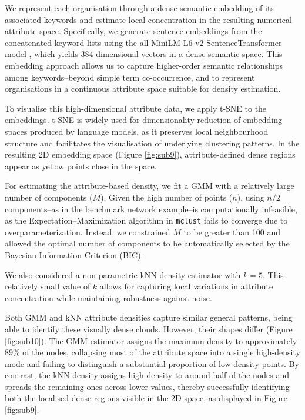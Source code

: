 \documentclass[11pt]{article}
\begin{document}
We represent each organisation through a dense semantic embedding of its associated keywords and estimate local concentration in the resulting numerical attribute space.
Specifically, we generate sentence embeddings from the concatenated keyword lists using the all-MiniLM-L6-v2 SentenceTransformer model \citep{HuggingFace2024All-MiniLM-L6-v2}, which yields 384-dimensional vectors in a dense semantic space. This embedding approach allows us to capture higher-order semantic relationships among keywords--beyond simple term co-occurrence, and to represent organisations in a continuous attribute space suitable for density estimation.

To visualise this high-dimensional attribute data, we apply t-SNE to the embeddings. t-SNE \citep{vanderMaaten2008} is widely used for dimensionality reduction of embedding spaces produced by language models, as it preserves local neighbourhood structure and facilitates the visualisation of underlying clustering patterns.
In the resulting 2D embedding space (Figure \ref{fig:sub9}), attribute-defined dense regions appear as yellow points close in the space. 

For estimating the attribute-based density, we fit a GMM with a relatively large number of components ($M$). Given the high number of points ($n$), using $n/2$ components--as in the benchmark network example--is computationally infeasible, as the Expectation–Maximization algorithm in {\tt mclust} fails to converge due to overparameterization. Instead, we constrained $M$ to be greater than 100 and allowed the optimal number of components to be automatically selected by the Bayesian Information Criterion (BIC).

We also considered a non-parametric kNN density estimator with $k = 5$. This relatively small value of $k$ allows for capturing local variations in attribute concentration while maintaining robustness against noise.

Both GMM and kNN attribute densities capture similar general patterns, being able to identify these visually dense clouds. However, their shapes differ (Figure \ref{fig:sub10}). The GMM estimator assigns the maximum density to approximately 89\% of the nodes, collapsing most of the attribute space into a single high-density mode and failing to distinguish a substantial proportion of low-density points. By contrast, the kNN density assigns high density to around half of the nodes and spreads the remaining ones across lower values, thereby successfully identifying both the localised dense regions visible in the 2D space, as displayed in Figure \ref{fig:sub9}. 
\end{document}
